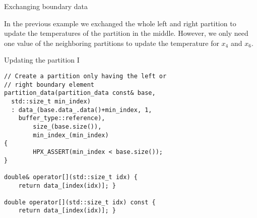 \documentclass[12pt,t]{beamer}
\begin{document}
\begin{frame}{Exchanging boundary data}

\begin{center}

\end{center}

In the previous example we exchanged the whole left and right partition to update the temperatures of the partition in the middle. However, we only need one value of the neighboring partitions to update the temperature for $x_4$ and $x_6$.

\end{frame}

\begin{frame}[fragile]{Updating the partition I }

\begin{lstlisting}
// Create a partition only having the left or 
// right boundary element
partition_data(partition_data const& base, 
  std::size_t min_index)
  : data_(base.data_.data()+min_index, 1, 
  	buffer_type::reference),
        size_(base.size()),
        min_index_(min_index)
{
        HPX_ASSERT(min_index < base.size());
}

double& operator[](std::size_t idx) { 
	return data_[index(idx)]; }

double operator[](std::size_t idx) const { 
	return data_[index(idx)]; }
	
\end{lstlisting}

\end{frame}
\end{document}
